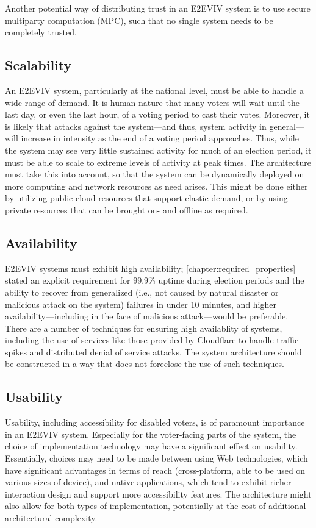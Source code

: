 Another potential way of distributing trust in an E2EVIV system is to
use secure multiparty computation (MPC), such that no single system
needs to be completely trusted. 

\subsection{Scalability}

An E2EVIV system, particularly at the national level, must be able to
handle a wide range of demand. It is human nature that many voters
will wait until the last day, or even the last hour, of a voting
period to cast their votes. Moreover, it is likely that attacks
against the system---and thus, system activity in general---will
increase in intensity as the end of a voting period approaches. Thus,
while the system may see very little sustained activity for much of an
election period, it must be able to scale to extreme levels of
activity at peak times. The architecture must take this into account,
so that the system can be dynamically deployed on more computing and
network resources as need arises. This might be done either by
utilizing public cloud resources that support elastic demand, or by
using private resources that can be brought on- and offline as
required.

\subsection{Availability}

E2EVIV systems must exhibit high availability;
\autoref{chapter:required_properties} stated an explicit requirement
for 99.9\% uptime during election periods and the ability to recover
from generalized (i.e., not caused by natural disaster or malicious
attack on the system) failures in under 10 minutes, and higher
availability---including in the face of malicious attack---would be
preferable. There are a number of techniques for ensuring high
availablity of systems, including the use of services like those
provided by Cloudflare to handle traffic spikes and distributed denial
of service attacks. The system architecture should be constructed in a
way that does not foreclose the use of such techniques.

\subsection{Usability}

Usability, including accessibility for disabled voters, is of
paramount importance in an E2EVIV system. Especially for the
voter-facing parts of the system, the choice of implementation
technology may have a significant effect on usability. Essentially,
choices may need to be made between using Web technologies, which have
significant advantages in terms of reach (cross-platform, able to be
used on various sizes of device), and native applications, which tend
to exhibit richer interaction design and support more accessibility
features. The architecture might also allow for both types of
implementation, potentially at the cost of additional architectural
complexity.

